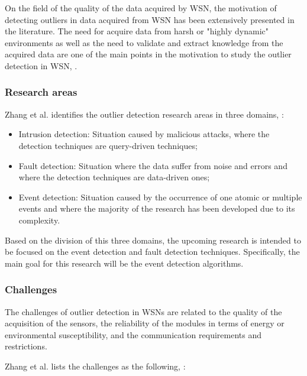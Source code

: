 On the field of the quality of the data acquired by \ac{WSN}, the motivation of detecting outliers in data acquired from \ac{WSN} has been extensively presented in the literature. The need for acquire data from harsh or "highly dynamic" environments as well as the need to validate and extract knowledge from the acquired data are one of the main points in the motivation to study the outlier detection in \ac{WSN},  \cite{gen:zhang:2010,gen:chandola:2009,stat:ghorbel:2015,class:martins:2015b}.



\subsubsection{Research areas}
Zhang et al. identifies the outlier detection research areas in three domains, \cite{gen:zhang:2010} : 

\begin{itemize}
	\item Intrusion detection: Situation caused by malicious attacks, where the detection techniques are query-driven techniques;
	
	\item Fault detection: Situation where the data suffer from noise and errors and where the detection techniques are data-driven ones;
	
	\item Event detection: Situation caused by the occurrence of one atomic or multiple events and where the majority of the research has been developed due to its complexity.
\end{itemize}

Based on the division of this three domains, the upcoming research is intended to be focused on the event detection and fault detection techniques. Specifically, the main goal for this research will be the event detection algorithms.


\subsubsection{Challenges}

The challenges of outlier detection in WSNs are related to the quality of the acquisition of the sensors, the reliability of the modules in terms of energy or environmental susceptibility, and the communication requirements and restrictions.

Zhang et al. lists the challenges as the following,  \cite{gen:zhang:2010}:

